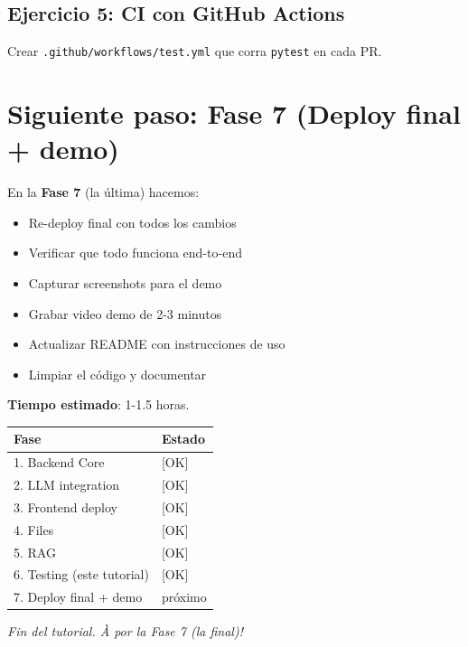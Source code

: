 \documentclass[11pt,a4paper,oneside]{article}
\begin{document}
\subsection{Ejercicio 5: CI con GitHub Actions}

Crear \texttt{.github/workflows/test.yml} que corra \texttt{pytest} en cada PR.

\section{Siguiente paso: Fase 7 (Deploy final + demo)}

En la \textbf{Fase 7} (la \'ultima) hacemos:

\begin{itemize}
  \item Re-deploy final con todos los cambios
  \item Verificar que todo funciona end-to-end
  \item Capturar screenshots para el demo
  \item Grabar video demo de 2-3 minutos
  \item Actualizar README con instrucciones de uso
  \item Limpiar el c\'odigo y documentar
\end{itemize}

\textbf{Tiempo estimado}: 1-1.5 horas.

\begin{center}
\begin{tabular}{ll}
\toprule
Fase & Estado \\
\midrule
1. Backend Core & [OK] \\
2. LLM integration & [OK] \\
3. Frontend deploy & [OK] \\
4. Files & [OK] \\
5. RAG & [OK] \\
6. Testing (este tutorial) & [OK] \\
7. Deploy final + demo & pr\'oximo \\
\bottomrule
\end{tabular}
\end{center}

\vspace{2em}
\begin{center}
\textit{Fin del tutorial. \`A por la Fase 7 (la final)!}
\end{center}
\end{document}

